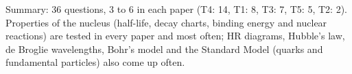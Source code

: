 \documentclass[12pt]{article}
\begin{document}
Summary: 36 questions, 3 to 6 in each paper (T4: 14, T1: 8, T3: 7, T5: 5, T2: 2).
Properties of the nucleus (half-life, decay charts, binding energy and nuclear reactions) are tested in every paper and most often; HR diagrams, Hubble's law, de Broglie wavelengths, Bohr's model and the Standard Model (quarks and fundamental particles) also come up often.
\end{document}
